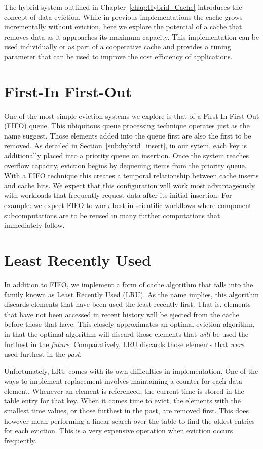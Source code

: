 The hybrid system outlined in Chapter~\ref{chap:Hybrid_Cache} introduces the
concept of data eviction. While in previous implementations the cache grows
incrementally without eviction, here we explore the potential of a cache that
removes data as it approaches its maximum capacity. This implementation can be
used individually or as part of a cooperative cache and provides a tuning
parameter that can be used to improve the cost efficiency of applications.

\section{First-In First-Out} %
\label{sec:fifo}
One of the most simple eviction systems we explore is that of a First-In
First-Out (FIFO) queue. This ubiquitous queue processing technique operates
just as the name suggest. Those elements added into the queue first are also
the first to be removed. As detailed in Section~\ref{sub:hybrid_insert}, in our
sytem, each key is additionally placed into a priority queue on insertion. Once
the system reaches overflow capacity, eviction begins by dequeuing items from
the priority queue. With a FIFO technique this creates a temporal relationship
between cache inserts and cache hits. We expect that this configuration will
work most advantageously with workloads that frequently request data after its
initial insertion. For example: we expect FIFO to work best in scientific
workflows where component subcomputations are to be reused in many further
computations that immediately follow.


\section{Least Recently Used} %
\label{sec:lru}
In addition to FIFO, we implement a form of cache algorithm that falls into the
family known as Least Recently Used (LRU). As the name implies, this algorithm
discards elements that have been used the least recently first. That is,
elements that have not been accessed in recent history will be ejected from the
cache before those that have. This closely approximates an optimal eviction
algorithm, in that the optimal algorithm will discard those elements that
\emph{will} be used the furthest in the \emph{future}. Comparatively, LRU
discards those elements that \emph{were} used furthest in the \emph{past}.

Unfortunately, LRU comes with its own difficulties in implementation.
One of the ways to implement replacement involves maintaining a counter for
each data element. Whenever an element is referenced, the current time is
stored in the table entry for that key. When it comes time to evict, the
elements with the smallest time values, or those furthest in the past, are
removed first. This does however mean performing a linear search over the table
to find the oldest entries for each eviction. This is a very expensive
operation when eviction occurs frequently.

